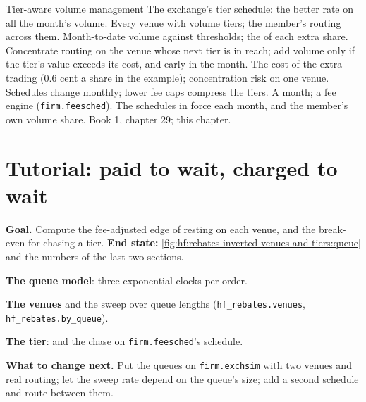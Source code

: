 \begin{strategyfile}{Tier-aware volume management}\label{strat:hf:rebates-inverted-venues-and-tiers:tier}
 The exchange's tier schedule: the better rate on all the month's volume.
 Every venue with volume tiers; the member's routing across them.
 Month-to-date volume against thresholds; the  of each extra share.
 Concentrate routing on the venue whose next tier is in reach; add volume only if the tier's value exceeds its cost,
and early in the month.
 The cost of the extra trading (0.6 cent a share in the example); concentration risk on one venue.
 Schedules change monthly; lower fee caps compress the tiers.
 A month; a fee engine (\texttt{firm.feesched}).
 The schedules in force each month, and the member's own volume share.
 Book 1, chapter 29; this chapter.
\end{strategyfile}

\section{Tutorial: paid to wait, charged to wait}\label{tut:hf:rebates-inverted-venues-and-tiers:tut}

\begin{tutorial}
\textbf{Goal.} Compute the fee-adjusted edge of resting on each venue, and the break-even for chasing a tier. \textbf{End state:}
\cref{fig:hf:rebates-inverted-venues-and-tiers:queue} and the numbers of the last two sections.
\begin{tutsteps}
\item \textbf{The queue model}: three exponential clocks per order.
\label{lst:hf:rebates-inverted-venues-and-tiers:queue}
\item \textbf{The venues} and the sweep over queue lengths (\texttt{hf\_rebates.venues}, \texttt{hf\_rebates.by\_queue}).
\item \textbf{The tier}:  and the chase on \texttt{firm.feesched}'s schedule.
\label{lst:hf:rebates-inverted-venues-and-tiers:chase}
\end{tutsteps}
\textbf{What to change next.} Put the queues on \texttt{firm.exchsim} with two venues and real routing; let the sweep rate depend on the queue's
size; add a second schedule and route between them.
\end{tutorial}

